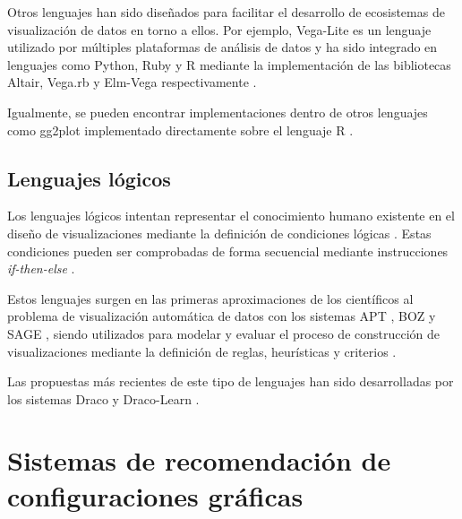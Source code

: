Otros lenguajes han sido dise\~nados para facilitar el desarrollo de ecosistemas de
visualizaci\'on de datos en torno a ellos. Por ejemplo, Vega-Lite \cite{satyanarayan2016vega} es un lenguaje utilizado
por m\'ultiples plataformas de an\'alisis de datos y ha sido integrado en lenguajes como Python, Ruby y R mediante
la implementaci\'on de las bibliotecas Altair, Vega.rb y Elm-Vega respectivamente \cite{vegaEco}.

Igualmente, se pueden encontrar implementaciones dentro de otros lenguajes como gg2plot implementado
directamente sobre el lenguaje R \cite{wickham2010layered}.

\subsection{Lenguajes l\'ogicos}

Los lenguajes l\'ogicos intentan representar el conocimiento humano existente  en el dise\~no
de visualizaciones mediante la definici\'on de condiciones l\'ogicas \cite{bertin1983semiology}. Estas condiciones pueden ser comprobadas de forma
secuencial mediante instrucciones \textit{if-then-else} \cite{godfrey2016interactive}.

Estos lenguajes surgen
en las primeras aproximaciones de los cient\'ificos al problema de visualizaci\'on autom\'atica de
datos con los sistemas APT \cite{mackinlay1986automating}, BOZ \cite{casner1991task} y SAGE \cite{roth1994interactive}, siendo utilizados para modelar y evaluar el proceso de construcci\'on de visualizaciones mediante la definici\'on de reglas, heur\'isticas y
criterios \cite{godfrey2016interactive}. 

Las propuestas m\'as recientes de este tipo de lenguajes han sido desarrolladas por los sistemas Draco y Draco-Learn \cite{moritz2018draco}.





\section{Sistemas de recomendaci\'on de configuraciones gr\'aficas}\label{section:rec-system}

